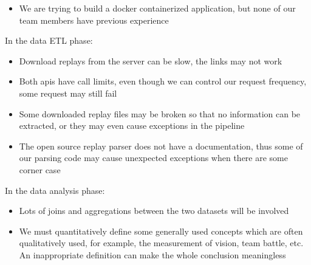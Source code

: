 \documentclass{article}
\begin{document}
\begin{itemize}
	\item We are trying to build a docker containerized application, but none of our team members have previous experience
\end{itemize}

In the data ETL phase:

\begin{itemize}
	\item Download replays from the server can be slow, the links may not work
	\item Both apis have call limits, even though we can control our request frequency, some request may still fail
	\item Some downloaded replay files may be broken so that no information can be extracted, or they may even cause exceptions in the pipeline
	\item The open source replay parser does not have a documentation, thus some of our parsing code may cause unexpected exceptions when there are some corner case
\end{itemize}


In the data analysis phase:

\begin{itemize}
	\item Lots of joins and aggregations between the two datasets will be involved
	\item We must quantitatively define some generally used concepts which are often qualitatively used, for example, the measurement of vision, team battle, etc. An inappropriate definition can make the whole conclusion meaningless
\end{itemize}


\end{document}
